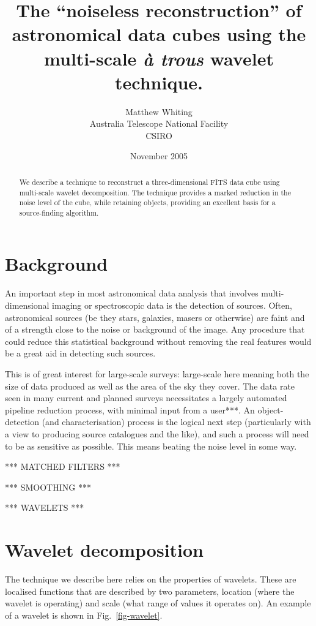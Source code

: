 \documentclass[11pt]{article}
\title{The ``noiseless reconstruction'' of astronomical data cubes
  using the multi-scale {\it \`a trous} wavelet technique.}
\author{Matthew Whiting\\Australia Telescope National Facility\\CSIRO}
\date{November 2005}
\begin{document}
\maketitle

\begin{abstract}
We describe a technique to reconstruct a three-dimensional FITS data
cube using multi-scale wavelet decomposition. The technique provides a
marked reduction in the noise level of the cube, while retaining
objects, providing an excellent basis for a source-finding algorithm. 
\end{abstract}

\section{Background}

An important step in most astronomical data analysis that involves
multi-dimensional imaging or spectroscopic data is the detection of
sources. Often, astronomical sources (be they stars, galaxies, masers
or otherwise) are faint and of a strength close to the noise or
background of the image. Any procedure that could reduce this
statistical background without removing the real features would be a
great aid in detecting such sources.

This is of great interest for large-scale surveys: large-scale here
meaning both the size of data produced as well as the area of the sky
they cover. The data rate seen in many current and planned surveys
necessitates a largely automated pipeline reduction process, with
minimal input from a user***. An object-detection (and
characterisation) process is the logical next step (particularly with
a view to producing source catalogues and the like), and such a
process will need to be as sensitive as possible. This means beating
the noise level in some way. 

*** MATCHED FILTERS ***

*** SMOOTHING ***

*** WAVELETS ***

\section{Wavelet decomposition}

The technique we describe here relies on the properties of
wavelets. These are localised functions that are described by two
parameters, location (where the wavelet is operating) and scale (what
range of values it operates on). An example of a wavelet is shown in
Fig.~\ref{fig-wavelet}. 
\end{document}
